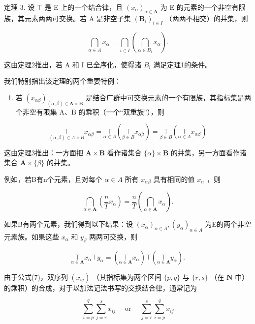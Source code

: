 定理 3. 设 \(\top\) 是 E 上的一个结合律，且 \((x_{\alpha})_{\alpha \in \mathbf{A}}\) 为 E 的元素的一个非空有限族，其元素两两可交换。若 A 是非空子集 \((\mathbf{B}_i)_{i\in I}\) （两两不相交）的并集，则

\[
\bigcap_ {\alpha \in A} x _ {\alpha} = \bigcap_ {i \in I} \left(\bigcap_ {\alpha \in B _ {i}} x _ {\alpha}\right).\tag{6}
\]

这由定理2推出，若 A 和 I 已全序化，使得诸 \(B_{i}\) 满足定理1的条件。

我们特别指出该定理的两个重要特例：

\begin{enumerate}
\def\labelenumi{\arabic{enumi}.}
\tightlist
\item
  若 \((x_{\alpha\beta})_{(\alpha,\beta)\in\mathbf{A}\times\mathbf{B}}\) 是结合广群中可交换元素的一个有限族，其指标集是两个非空有限集 A、B 的乘积（一个“双重族”），则
\end{enumerate}

\[
\underset {(\alpha , \beta) \in A \times B} {\top} x _ {\alpha \beta} = \underset {\alpha \in A} {\top} \left(\underset {\beta \in B} {\top} x _ {\alpha \beta}\right) = \underset {\beta \in B} {\top} \left(\underset {\alpha \in A} {\top} x _ {\alpha \beta}\right)\tag{7}
\]

这由定理3推出：一方面把 \(\mathbf{A} \times \mathbf{B}\) 看作诸集合 \(\{\alpha\} \times \mathbf{B}\) 的并集，另一方面看作诸集合 \(\mathbf{A} \times \{\beta\}\) 的并集。

例如，若B有n个元素，且对每个 \(\alpha \in A\) 所有 \(x_{\alpha\beta}\) 具有相同的值 \(x_{\alpha}\) ，则

\[
\bigcap_ {\alpha \in \mathbf {A}} \left(\frac {n}{T} x _ {\alpha}\right) = \frac {n}{T} \left(\bigcap_ {\alpha \in \mathbf {A}} x _ {\alpha}\right).\tag{8}
\]

如果B有两个元素，我们得到以下结果：设 \((x_{\alpha})_{\alpha \in A}, (y_{\alpha})_{\alpha \in A}\) 为E的两个非空元素族。如果这些 \(x_{\alpha}\) 和 \(y_{\beta}\) 两两可交换，则

\[
\underset {\alpha \in \mathbf {A}} {\top} x _ {\alpha} \top y _ {\alpha} = \left(\underset {\alpha \in \mathbf {A}} {\top} x _ {\alpha}\right) \top \left(\underset {\alpha \in \mathbf {A}} {\top} y _ {\alpha}\right).\tag{9}
\]

由于公式(7)，双序列 \((x_{ij})\) （其指标集为两个区间 \(\{p, q\}\) 与 \(\{r, s\}\) （在 \(\mathbf{N}\) 中）的乘积）的合成，对于以加法记法书写的交换结合律，通常记为

\[
\sum_ {i = p} ^ {q} \sum_ {j = r} ^ {s} x _ {i j} \quad \text { or } \quad \sum_ {j = r} ^ {s} \sum_ {i = p} ^ {q} x _ {i j}
\]

